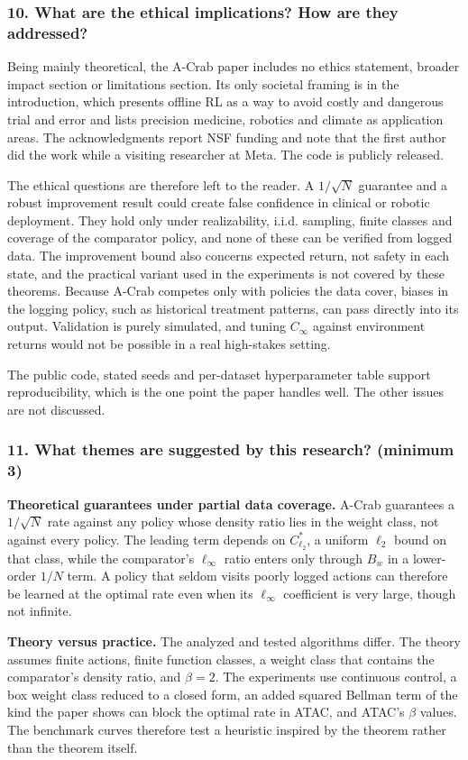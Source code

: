 \documentclass[11pt]{article}
\newcommand{\question}[1]{\subsubsection*{#1}}
\begin{document}
\question{10. What are the ethical implications? How are they addressed?}

Being mainly theoretical, the A-Crab paper includes no ethics statement, broader impact section or limitations section. Its only societal framing is in the introduction, which presents offline RL as a way to avoid costly and dangerous trial and error and lists precision medicine, robotics and climate as application areas. The acknowledgments report NSF funding and note that the first author did the work while a visiting researcher at Meta. The code is publicly released.

The ethical questions are therefore left to the reader. A $1/\sqrt{N}$ guarantee and a robust improvement result could create false confidence in clinical or robotic deployment. They hold only under realizability, i.i.d. sampling, finite classes and coverage of the comparator policy, and none of these can be verified from logged data. The improvement bound also concerns expected return, not safety in each state, and the practical variant used in the experiments is not covered by these theorems. Because A-Crab competes only with policies the data cover, biases in the logging policy, such as historical treatment patterns, can pass directly into its output. Validation is purely simulated, and tuning $C_\infty$ against environment returns would not be possible in a real high-stakes setting.

The public code, stated seeds and per-dataset hyperparameter table support reproducibility, which is the one point the paper handles well. The other issues are not discussed.

\question{11. What themes are suggested by this research? (minimum 3)}

\textbf{Theoretical guarantees under partial data coverage.} A-Crab guarantees a $1/\sqrt{N}$ rate against any policy whose density ratio lies in the weight class, not against every policy. The leading term depends on $C^{*}_{\ell_2}$, a uniform $\ell_2$ bound on that class, while the comparator's $\ell_\infty$ ratio enters only through $B_w$ in a lower-order $1/N$ term. A policy that seldom visits poorly logged actions can therefore be learned at the optimal rate even when its $\ell_\infty$ coefficient is very large, though not infinite.

\textbf{Theory versus practice.} The analyzed and tested algorithms differ. The theory assumes finite actions, finite function classes, a weight class that contains the comparator's density ratio, and $\beta=2$. The experiments use continuous control, a box weight class reduced to a closed form, an added squared Bellman term of the kind the paper shows can block the optimal rate in ATAC, and ATAC's \ensuremath{\beta} values. The benchmark curves therefore test a heuristic inspired by the theorem rather than the theorem itself.
\end{document}
